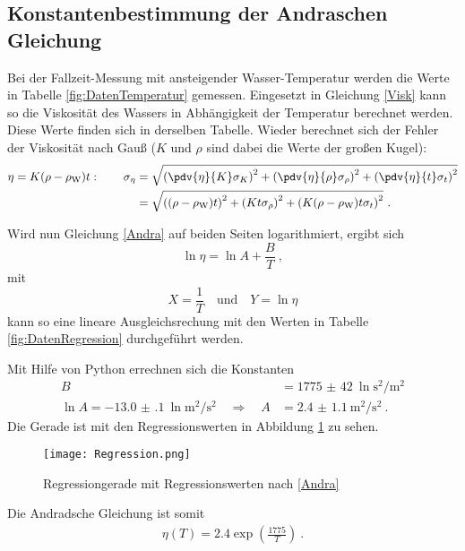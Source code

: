 \subsection{Konstantenbestimmung der Andraschen Gleichung}
Bei der Fallzeit-Messung mit ansteigender Wasser-Temperatur werden die Werte in Tabelle \ref{fig:DatenTemperatur} gemessen. Eingesetzt in Gleichung \eqref{Visk} kann so die Viskosität des Wassers in Abhängigkeit der Temperatur berechnet werden. Diese Werte finden sich in derselben Tabelle. Wieder berechnet sich der Fehler der Viskosität nach Gauß ($K$ und $\rho$ sind dabei die Werte der großen Kugel):
\begin{align}
	\eta = K(\rho-\rho_\text{W})t: \qquad \sigma_{\eta} &= \sqrt{\left(\pdv{\eta}{K}\sigma_K\right)^2+\left(\pdv{\eta}{\rho}\sigma_{\rho}\right)^2 + \left(\pdv{\eta}{t}\sigma_{t}\right)^2} \\
	&= \sqrt{\left((\rho-\rho_\text{W})t\right)^2+\left(Kt\sigma_\rho\right)^2+\left(K(\rho-\rho_\text{W})t\sigma_t\right)^2} \ .
\end{align}

Wird nun Gleichung \eqref{Andra} auf beiden Seiten logarithmiert, ergibt sich
\[ \ln\eta = \ln A + \frac{B}{T} \ , \]
mit
\[ X = \frac{1}{T} \quad \text{und} \quad Y = \ln\eta \]
kann so eine lineare Ausgleichsrechung mit den Werten in Tabelle \ref{fig:DatenRegression} durchgeführt werden.

Mit Hilfe von Python errechnen sich die Konstanten
\begin{align}
	B &= \SI{1775(42)}{\ln\second\squared\per\metre\squared} \\
	\ln A = \SI{-13.0(1)}{\ln\metre\squared\per\second\squared} \quad \Rightarrow \quad A &= \SI{2.4(11)}{\metre\squared\per\second\squared} \ .
\end{align}
Die Gerade ist mit den Regressionswerten in Abbildung \ref{fig:Regression} zu sehen.
\begin{figure}[h!]
	\centering
	\texttt{[image: Regression.png]}
	\caption{Regressiongerade mit Regressionswerten nach \eqref{Andra}}
	\label{fig:Regression}
\end{figure}
Die Andradsche Gleichung ist somit
\begin{align}
	\eta(T) = 2.4\exp\left(\frac{1775}{T}\right) \ .
\end{align}
\clearpage

